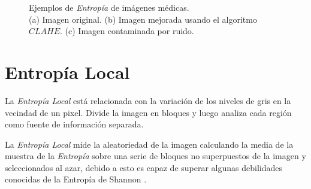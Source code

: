 \begin{figure}[H]
    \begin{center}
    \end{center}
    \caption{Ejemplos de \textit{Entropía} de imágenes médicas. \\
    (a) Imagen original.
    (b) Imagen mejorada usando el algoritmo $CLAHE$.
    (c) Imagen contaminada por ruido.}
    \label{fig:entropia}
\end{figure}


\section{Entropía Local}
\label{sec:entropialocal}

La \textit{Entropía Local} \cite{localentropy} está relacionada con la variación de los niveles de gris en la vecindad de un pixel. Divide la imagen en bloques y luego analiza cada región como fuente de información separada.

La \textit{Entropía Local} mide la aleatoriedad de la imagen calculando la media de la muestra de la \textit{Entropía} sobre una serie de bloques no superpuestos de la imagen y seleccionados al azar, debido a esto es capaz de superar algunas debilidades conocidas de la Entropía de Shannon \cite{localshanonentropy}.

